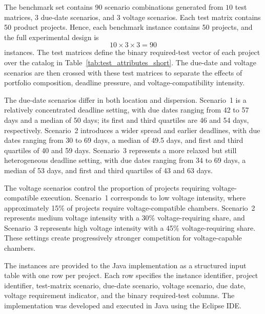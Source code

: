 

The benchmark set contains 90 scenario combinations generated from
\(10\) test matrices, \(3\) due-date scenarios, and \(3\) voltage scenarios.
Each test matrix contains 50 product projects. Hence, each benchmark instance
contains 50 projects, and the full experimental design is
\[
10 \times 3 \times 3 = 90
\]
instances. The test matrices define the binary required-test vector of each
project over the catalog in Table~\ref{tab:test_attributes_short}. The
due-date and voltage scenarios are then crossed with these test matrices to
separate the effects of portfolio composition, deadline pressure, and
voltage-compatibility intensity.

The due-date scenarios differ in both location and dispersion. Scenario~1 is a
relatively concentrated deadline setting, with due dates ranging from 42 to
57 days and a median of 50 days; its first and third quartiles are 46 and
54 days, respectively. Scenario~2 introduces a wider spread and earlier
deadlines, with due dates ranging from 30 to 69 days, a median of 49.5 days,
and first and third quartiles of 40 and 59 days. Scenario~3 represents a more
relaxed but still heterogeneous deadline setting, with due dates ranging from
34 to 69 days, a median of 53 days, and first and third quartiles of 43 and
63 days.

The voltage scenarios control the proportion of projects requiring
voltage-compatible execution. Scenario~1 corresponds to low voltage intensity,
where approximately 15\% of projects require voltage-compatible chambers.
Scenario~2 represents medium voltage intensity with a 30\% voltage-requiring
share, and Scenario~3 represents high voltage intensity with a 45\%
voltage-requiring share. These settings create progressively stronger
competition for voltage-capable chambers.

The instances are provided to the Java implementation as a structured input
table with one row per project. Each row specifies the instance identifier,
project identifier, test-matrix scenario, due-date scenario, voltage scenario,
due date, voltage requirement indicator, and the binary required-test columns.
The implementation was developed and executed in Java using the Eclipse IDE.

